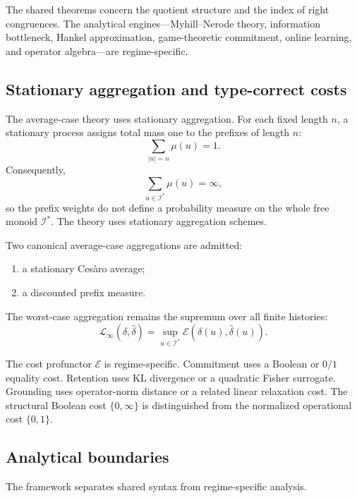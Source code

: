 \documentclass[12pt]{article}
\theoremstyle{definition}
\begin{document}
The shared theorems concern the quotient structure and the index of right
congruences.  The analytical engines---Myhill--Nerode theory, information
bottleneck, Hankel approximation, game-theoretic commitment, online learning,
and operator algebra---are regime-specific.

\subsection{Stationary aggregation and type-correct costs}
\label{subsec:stationary-intro}

The average-case theory uses stationary aggregation.  For each fixed length
$n$, a stationary process assigns total mass one to the prefixes of length $n$:
\[
\sum_{|u|=n}\mu(u)=1.
\]
Consequently,
\[
\sum_{u\in\mathcal I^*}\mu(u)=\infty,
\]
so the prefix weights do not define a probability measure on the whole free
monoid $\mathcal I^*$.  The theory uses stationary aggregation schemes.

Two canonical average-case aggregations are admitted:
\begin{enumerate}[nosep,label=(\alph*)]
\item a stationary Ces\`aro average;
\item a discounted prefix measure.
\end{enumerate}

The worst-case aggregation remains the supremum over all finite histories:
\[
\mathcal L_\infty(\delta,\widehat\delta)
=
\sup_{u\in\mathcal I^*}
\mathcal E(\delta(u),\widehat\delta(u)).
\]

The cost profunctor $\mathcal E$ is regime-specific.  Commitment uses a
Boolean or $0/1$ equality cost.  Retention uses KL divergence or a quadratic
Fisher surrogate.  Grounding uses operator-norm distance or a related linear
relaxation cost.  The structural Boolean cost $\{0,\infty\}$ is distinguished
from the normalized operational cost $\{0,1\}$.

\subsection{Analytical boundaries}
\label{subsec:boundaries-intro}

The framework separates shared syntax from regime-specific analysis.
\end{document}
